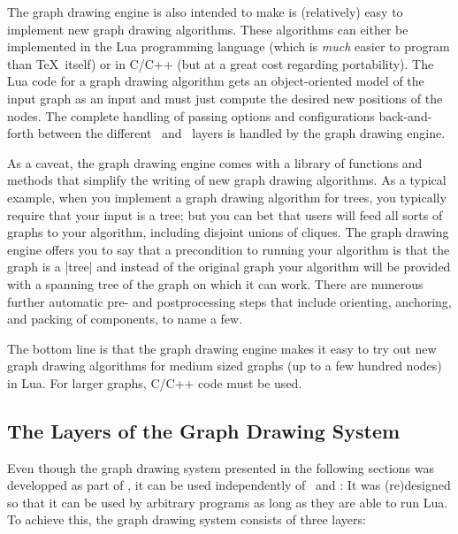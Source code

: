 The graph drawing engine is also intended to make is
(relatively) easy to implement new graph drawing algorithms. These
algorithms can either be implemented in the Lua programming
language (which is \emph{much} easier to program than \TeX\
itself) or in C/C++ (but at a great cost regarding portability). The
Lua code for a graph drawing algorithm gets an 
object-oriented model of the input graph as an input and must just
compute the desired new positions of the nodes. The complete
handling of passing options and configurations back-and-forth
between the different \tikzname\ and \pgfname\ layers is handled by
the graph drawing engine. 

As a caveat, the graph drawing engine comes with a library of
functions and methods that simplify the writing of new
graph drawing algorithms. As a typical example, when you implement a 
graph drawing algorithm for trees, you typically require that your
input is a tree; but you can bet that users will feed all sorts of
graphs to your algorithm, including disjoint unions of cliques. The
graph drawing engine offers you to say that a precondition to running
your algorithm is that the graph is a |tree| and instead of the original graph your
algorithm will be provided with a spanning tree of the graph on
which it can work. There are numerous further automatic pre- and
postprocessing steps that include orienting, anchoring, and packing
of components, to name a few.

The bottom line is that the graph drawing engine makes it easy
to try out new graph drawing algorithms for medium sized graphs (up
to a few hundred nodes) in Lua. For larger graphs, C/C++ code must be
used.



\subsection{The Layers of the Graph Drawing System}

\label{section-gd-layers}

Even though the graph drawing system presented in the following
sections was developped as part of \pgfname, it can be used
independently of \pgfname\ and \tikzname: It was (re)designed so that
it can be used by arbitrary programs as long as they are able to run
Lua. To achieve this, the graph drawing system consists of three
layers:

